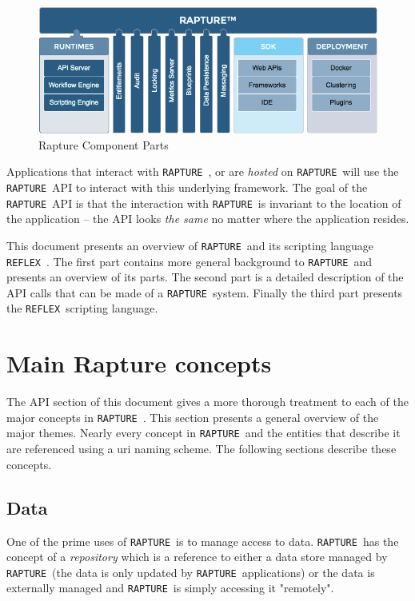 \documentclass[12pt,twoside,a4paper]{book}
\newcommand{\Rapture}{\Verb+RAPTURE+~}
\newcommand{\Reflex}{\Verb+REFLEX+~}
\begin{document}
\begin{figure}[htb]
\centering
\includegraphics[scale=0.5]{Graphics/rapturecore}
\caption{Rapture Component Parts}
\label{fig:RaptureDiagram}
\end{figure}

Applications that interact with \Rapture, or are \emph{hosted} on \Rapture will
use the \Rapture API to interact with this underlying framework. The goal of
the \Rapture API is that the interaction with \Rapture is invariant to the location
of the application -- the API looks \emph{the same} no matter where the application
resides.

This document presents an overview of \Rapture and its scripting language \Reflex. The first
part contains more general background to \Rapture and presents an overview of its parts. The second
part is a detailed description of the API calls that can be made of a \Rapture system. Finally the third
part presents the \Reflex scripting language.

\chapter{Main Rapture concepts}

The API section of this document gives a more thorough treatment to each of the major concepts in \Rapture. This section
presents a general overview of the major themes. Nearly every concept in \Rapture and the entities that describe it are
referenced using a uri naming scheme. The following sections describe these concepts.

\section{Data}
One of the prime uses of \Rapture is to manage access to data. \Rapture has the concept of a \emph{repository} which is a
reference to either a data store managed by \Rapture (the data is only updated by \Rapture applications) or
the data is externally managed and \Rapture is simply accessing it "remotely".
\end{document}
